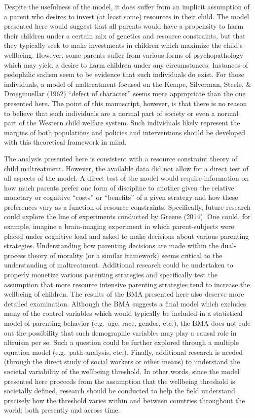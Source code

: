 \documentclass[]{elsarticle}
\begin{document}
Despite the usefulness of the model, it does suffer from an implicit
assumption of a parent who desires to invest (at least some) resources
in their child. The model presented here would suggest that all parents
would have a propensity to harm their children under a certain mix of
genetics and resource constraints, but that they typically seek to make
investments in children which maximize the child's wellbeing. However,
some parents suffer from various forms of psychopathology which may
yield a desire to harm children under any circumstances. Instances of
pedophilic sadism seem to be evidence that such individuals do exist.
For those individuals, a model of maltreatment focused on the Kempe,
Silverman, Steele, \& Droegmuellar (1962) ``defect of character'' seems
more appropriate than the one presented here. The point of this
manuscript, however, is that there is no reason to believe that such
individuals are a normal part of society or even a normal part of the
Western child welfare system. Such individuals likely represent the
margins of both populations and policies and interventions should be
developed with this theoretical framework in mind.

The analysis presented here is consistent with a resource constraint
theory of child maltreatment. However, the available data did not allow
for a direct test of all aspects of the model. A direct test of the
model would require information on how much parents prefer one form of
discipline to another given the relative monetary or cognitive ``costs''
or ``benefits'' of a given strategy and how these preferences vary as a
function of resource constraints. Specifically, future research could
explore the line of experiments conducted by Greene (2014). One could,
for example, imagine a brain-imaging experiment in which parent-subjects
were placed under cognitive load and asked to make decisions about
various parenting strategies. Understanding how parenting decisions are
made within the dual-process theory of morality (or a similar framework)
seems critical to the understanding of maltreatment. Additional research
could be undertaken to properly monetize various parenting strategies
and specifically test the assumption that more resource intensive
parenting strategies tend to increase the wellbeing of children. The
results of the BMA presented here also deserve more detailed
examination. Although the BMA suggests a final model which excludes many
of the control variables which would typically be included in a
statistical model of parenting behavior (e.g.~age, race, gender, etc.),
the BMA does not rule out the possibility that such demographic
variables may play a causal role in altruism per se. Such a question
could be further explored through a multiple equation model (e.g.~path
analysis, etc.). Finally, additional research is needed (through the
direct study of social workers or other means) to understand the
societal variability of the wellbeing threshold. In other words, since
the model presented here proceeds from the assumption that the wellbeing
threshold is societally defined, research should be conducted to help
the field understand precisely how the threshold varies within and
between countries throughout the world; both presently and across time.
\end{document}
